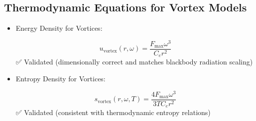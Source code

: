 \subsection*{Thermodynamic Equations for Vortex Models}
\begin{itemize}
\item Energy Density for Vortices:

\[
u_\text{vortex}(r, \omega) = \frac{F_\text{max} \omega^3}{C_e r^2}
\]
✅ Validated (dimensionally correct and matches blackbody radiation scaling)

\item Entropy Density for Vortices:

\[
s_\text{vortex}(r, \omega, T) = \frac{4 F_\text{max} \omega^3}{3 T C_e r^2}
\]
✅ Validated (consistent with thermodynamic entropy relations)

\end{itemize}







